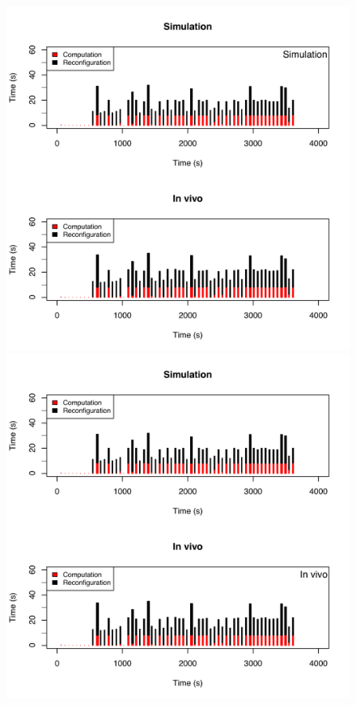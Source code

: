 \begin{figure}
\centering
\vspace*{-.75cm}
\includegraphics[width=1.1\linewidth]{./figures/accuraci-simu.pdf}
\vspace*{-.6cm}\includegraphics[width=1.1\linewidth]{./figures/accuraci-invivo.pdf}

\end{figure}
